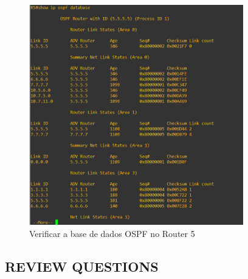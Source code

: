 \documentclass[11pt,english, openright, oneside]{book}
\begin{document}
\begin{itemize}
  \begin{figure}[H]
    \centering
    \includegraphics[width=0.83\textwidth]{imagens/Tarefa3/15.ospf_database_R5.png}
    \caption{Verificar a base de dados OSPF no Router 5}
    \label{fig:config26}
  \end{figure}
  \vspace{0.2cm}
\end{itemize}

\newpage
\subsection{REVIEW QUESTIONS}
\vspace{0.2cm}
\end{document}
